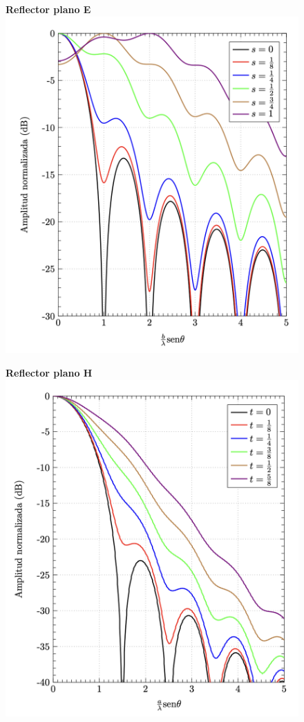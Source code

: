 \documentclass[twocolumn, 8pt]{extarticle}
\begin{document}
\begin{multicols}{2}
	\begin{figure}[H]
		\centering
		\textbf{Reflector plano E}
		\includegraphics[width=\columnwidth]{reflector_plano_e.png}
	\end{figure}

	\begin{figure}[H]
		\centering
		\textbf{Reflector plano H}
		\includegraphics[width=\columnwidth]{reflector_plano_h.png}
	\end{figure}
\end{multicols}
\end{document}
